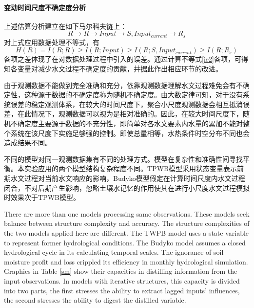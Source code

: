 
\paragraph{变动时间尺度不确定度分析}
上述估算分析建立在如下马尔科夫链上：
\begin{equation}
R \rightarrow R \rightarrow Input \rightarrow S,Input_{current} \rightarrow R_s
\end{equation}
对上式应用数据处理不等式，有
\begin{equation}
\label{ie2}
H(R)=I(R;R) \geq I(R;Input)\geq I(R;S,Input_{current}) \geq I(R;R_s)
\end{equation}
各项之差体现了在对数据处理过程中引入的误差。通过计算不等式\ref{ie2}各项，可得知各变量对减少水文过程不确定度的贡献，并据此作出相应环节的改进\citep{gong2013estimating}。

由于观测数据不能做到完全准确和充分，依靠观测数据理解水文过程难免会有不确定性，这种源于数据的不确定度称为随机不确定度。由大数定律可知，对于没有系统误差的稳定观测体系，在较大的时间尺度下，聚合小尺度观测数据会相互抵消误差，在此情况下，观测数据可以视为是相对准确的。因此，在较大时间尺度下，随机不确定度主要源于数据的不充分性，即简单对各水文要素内水量的累加不能对整个系统在该尺度下实施足够强的控制。即使总量相等，水热条件时空分布不同也会造成结果不同。

不同的模型对同一观测数据集有不同的处理方式。模型在复杂性和准确性间寻找平衡。本实验应用的两个模型结构复杂程度不同。TPWB模型采用状态变量表示前期水文过程对当前水文响应的影响，Budyko模型假定在计算时间尺度内水文过程闭合，不对后期产生影响，忽略土壤水记忆的作用使其在进行小尺度水文过程模拟时效果次于TPWB模型。


 


\iffalse
There are more than one models processing same observations. These models seek balance between structure complexity and accuracy. The structure complexities of the two models applied here are different. The TWPB model uses a state variable to represent former hydrological conditions. The Budyko model assumes a closed hydrological cycle in its calculating temporal scales. The ignorance of soil moisture profit and loss crippled its efficiency in monthly hydrological simulation. Graphics in Table \ref{sm} show their capacities in distilling information from the input observations. In models with iterative structures, this capacity is divided into two parts, the first stresses the ability to extract lagged inputs' influences, the second stresses the ability to digest the distilled variable. 




